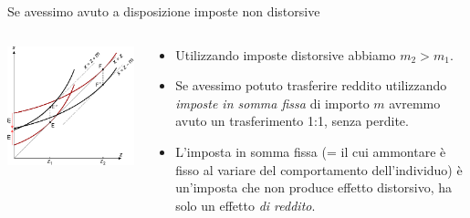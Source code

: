 \documentclass[aspectratio=64,12pt]{beamer}
\begin{document}
\begin{frame}{Se avessimo avuto a disposizione imposte non distorsive}
\begin{columns}[T]
\begin{column}{.55\columnwidth}
\begin{center}
\includegraphics[scale=.9]{./figure/effetto-distorsivo-imposte-ql-color-5.pdf}
\end{center}
\end{column}

\begin{column}{.45\columnwidth}
  \begin{itemize}
\item Utilizzando imposte distorsive abbiamo $m_2>m_1$.
\item Se avessimo potuto trasferire reddito utilizzando \emph{imposte in somma fissa} di importo $m$ avremmo avuto un trasferimento 1:1, senza perdite.
\item L'imposta in somma fissa (= il cui ammontare è fisso al variare del comportamento dell'individuo) è un'imposta che non produce effetto distorsivo, ha solo un effetto \emph{di reddito}.
\end{itemize}
\end{column}
\end{columns}
\end{frame}
\end{document}

